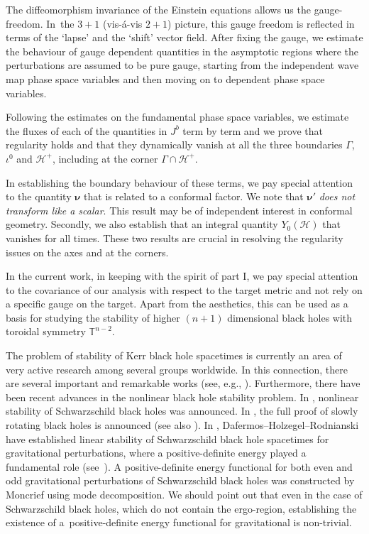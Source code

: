 \documentclass[11pt]{article}
\numberwithin{equation}{section}
\def\mbo#1{\boldsymbol{#1}}%
\renewcommand{\H}{\mathcal{H}}
\numberwithin{equation}{section}
\begin{document}
 The diffeomorphism invariance of the Einstein equations allows us the gauge-freedom. In~the ${3+1}$ (vis-\'a-vis $2+1$) picture, this gauge freedom is reflected in terms of the `lapse' and the `shift' vector field. After fixing the gauge, we estimate the behaviour of gauge dependent quantities in the asymptotic regions where the perturbations are assumed to be pure gauge, starting from the independent wave map phase space variables and then moving on to dependent phase space variables.

 Following the estimates on the fundamental phase space variables, we estimate the fluxes of each of the quantities in $J^b$ term by term and we prove that regularity holds and that they dynamically vanish at all the three boundaries $\Gamma$, $\iota^0$ and $\H^+$, including at the corner $\Gamma \cap \H^+$.

 In establishing the boundary behaviour of these terms,
 we pay special attention to the quantity $\mbo{\nu}$ that is related to a conformal factor. We note that $\mbo{\nu}'$ \emph{does not transform like a scalar}.
 This result may be of independent interest in conformal geometry. Secondly, we also establish that an integral quantity $Y_0(\mathcal{H})$ that vanishes for all times. These two results are crucial in resolving the regularity issues on the axes and at the corners.

In the current work, in keeping with the spirit of part I, we pay special attention to the covariance
of our analysis with respect to the target metric and not rely on a specific gauge on the target. Apart from the aesthetics, this can be used as a basis for studying the stability of higher $(n+1)$ dimensional black holes with toroidal symmetry $\mathbb{T}^{n-2}$.

The problem of stability of Kerr black hole spacetimes is currently an area of very active research among several groups worldwide. In this connection, there are several important and remarkable works (see, e.g., \cite{ABBM_19,LB_15_1, LB_15_2,HDR_17,DR_11, HHV_19, SMa_17_1, SMa_17_2, Tato_11}). Furthermore, there have been recent advances in the nonlinear black hole stability problem. In \cite{HDRT_21}, nonlinear stability of Schwarzschild black holes was announced. In \cite{GKS_22}, the full proof of slowly rotating black holes is announced (see also \cite{GKS_20, KS_21}). In \cite{HDR_16}, Dafermos--Holzegel--Rodnianski have established linear stability of Schwarzschild black hole spacetimes for gravitational perturbations, where a positive-definite energy played a fundamental role (see~\cite{GH_16}).
A positive-definite energy functional for both even and odd gravitational perturbations of Schwarzschild black holes was constructed by Moncrief \cite{Moncrief_74} using mode decomposition. We should point out that even in the case of Schwarzschild black holes, which do not contain the ergo-region, establishing the existence of a~positive-definite energy functional for gravitational is non-trivial.
\end{document}

